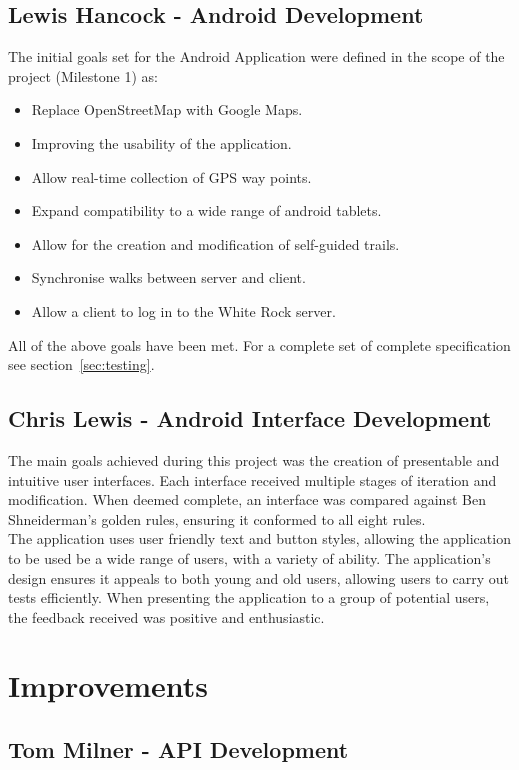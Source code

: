 \documentclass[11pt,a4paper]{report}
\begin{document}
\subsection{Lewis Hancock - Android Development}
The initial goals set for the Android Application were defined in the scope of the project (Milestone 1) as:
\begin{itemize}
\item Replace OpenStreetMap with Google Maps.
\item Improving the usability of the application.
\item Allow real-time collection of GPS way points.
\item Expand compatibility to a wide range of android tablets.
\item Allow for the creation and modification of self-guided trails.
\item Synchronise walks between server and client.
\item Allow a client to log in to the White Rock server.
\end{itemize}
All of the above goals have been met. For a complete set of complete specification see section~\ref{sec:testing}.
\subsection{Chris Lewis - Android Interface Development}

The main goals achieved during this project was the creation of presentable and intuitive user interfaces. Each interface received multiple stages of iteration and modification. When deemed complete, an interface was compared against Ben Shneiderman's golden rules, ensuring it conformed to all eight rules.\\

The application uses user friendly text and button styles, allowing the application to be used be a wide range of users, with a variety of ability. The application's design ensures it appeals to both young and old users, allowing users to carry out tests efficiently. When presenting the application to a group of potential users, the feedback received was positive and enthusiastic.

\section{Improvements}
\label{sec:improvements}
\subsection{Tom Milner - API Development}
\end{document}
